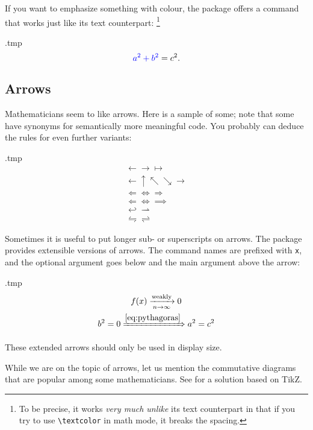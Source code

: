 If you want to emphasize something with colour,
the  package offers a  command that works
just like its text counterpart:%
\footnote{To be precise, it works \emph{very much unlike} its text counterpart in that
if you try to use \texttt{\textbackslash textcolor} in math mode, it breaks the spacing.}
%
\begin{VerbatimOut}{\jobname.tmp}
\[
\mathcolor{blue}{a^2 + b^2} = c^2.
\]
\end{VerbatimOut}
\ShowExample


%
%
\subsection{Arrows}
Mathematicians seem to like arrows.
Here is a sample of some;
note that some have synonyms for semantically more meaningful code.
You probably can deduce the rules for even further variants:
\begin{VerbatimOut}{\jobname.tmp}
\begin{gather*}
\gets \to \mapsto\\
\leftarrow \uparrow \nwarrow \searrow \rightarrow\\
\Leftarrow \Leftrightarrow \Rightarrow\\
\Longleftarrow \Longleftrightarrow \implies\\
\hookleftarrow \rightharpoonup\\
\leftrightharpoons \rightleftharpoons
\end{gather*}
\end{VerbatimOut}
\ShowExample

Sometimes it is useful to put longer sub- or superscripts on arrows.
The  package provides extensible versions of arrows.
The command names are prefixed with \verb|x|,
and the optional argument goes below and the main argument above the arrow:
%
\begin{VerbatimOut}{\jobname.tmp}
\begin{gather*}
f(x) \xrightarrow[n \to \infty]{\text{weakly}} 0\\
b^2 = 0
\xRightarrow{\eqref{eq:pythagoras}} a^2 = c^2
\end{gather*}
\end{VerbatimOut}
\ShowExample

\begin{gotcha}
These extended arrows should only be used in display size.
\end{gotcha}

While we are on the topic of arrows,
let us mention the commutative diagrams that are popular among some mathematicians.
See  for a solution based on TikZ.



